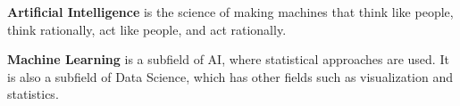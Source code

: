 
\begin{definition}
	\textbf{Artificial Intelligence} is the science of making machines that think like people, think rationally, act like people, and act rationally.
\end{definition}

\begin{definition}
	\textbf{Machine Learning} is a subfield of AI, where statistical approaches are used. It is also a subfield of Data Science, which has other fields such as visualization and statistics.
\end{definition}


